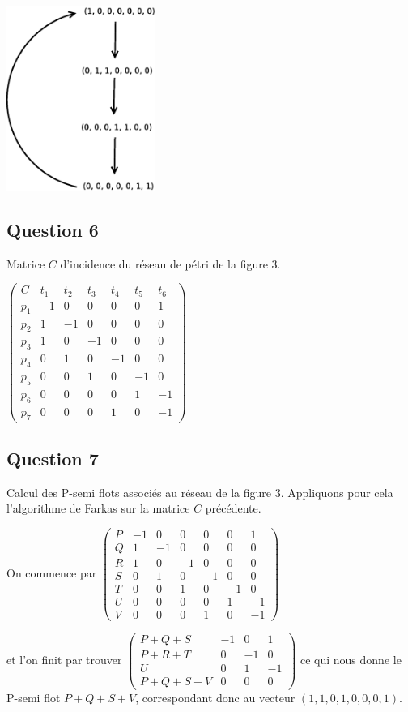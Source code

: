 \begin{center}
\includegraphics[height=6cm]{exo1_2.eps}
\end{center}

\subsection*{Question 6}
Matrice $C$ d'incidence du réseau de pétri de la figure $3$.

 $ \begin{pmatrix}
C&t_1&t_2&t_3&t_4&t_5&t_6 \\
p_1& -1&0&0&0&0&1 \\
p_2&1&-1&0&0&0&0 \\
p_3&1&0&-1&0&0&0 \\
p_4&0&1&0&-1&0&0 \\
p_5&0&0&1&0&-1&0 \\
p_6&0&0&0&0&1&-1 \\
p_7&0&0&0&1&0&-1 
\end{pmatrix}$

\subsection*{Question 7}
Calcul des P-semi flots associés au réseau de la figure
$3$. Appliquons pour cela l'algorithme de Farkas sur la matrice $C$
précédente.

On commence par  
$ \begin{pmatrix}
P& -1&0&0&0&0&1 \\
Q&1&-1&0&0&0&0 \\
R&1&0&-1&0&0&0 \\
S&0&1&0&-1&0&0 \\
T&0&0&1&0&-1&0 \\
U&0&0&0&0&1&-1 \\
V&0&0&0&1&0&-1 
\end{pmatrix}$

et l'on finit par trouver 
$ \begin{pmatrix}
P+Q+S& -1&0&1 \\
P+R+T&0&-1&0 \\
U&0&1&-1 \\
P+Q+S+V&0&0&0
\end{pmatrix}$
ce qui nous donne le P-semi flot $P+Q+S+V$, correspondant donc au
vecteur $(1, 1, 0, 1, 0, 0, 0, 1)$.


